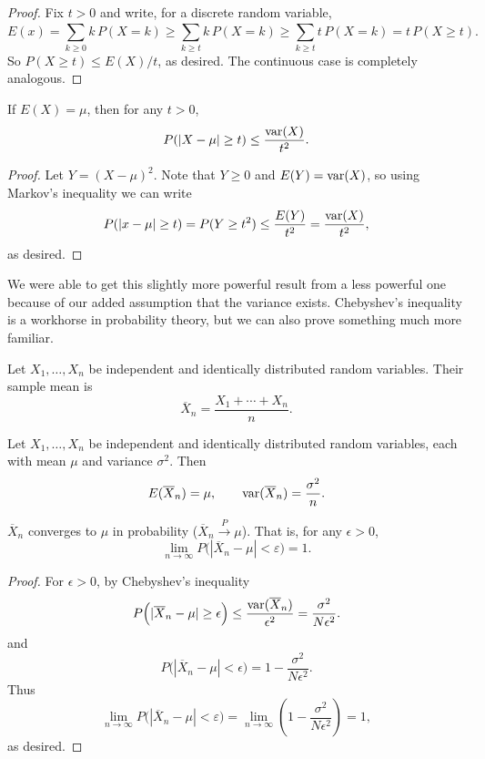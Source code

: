 \documentclass[../m157main.tex]{subfiles}
\begin{document}
\begin{proof}
    Fix $t > 0$ and write, for a discrete random variable,
    \[ E(x) = \sum_{k \geq 0}^{} k \,P(X = k) \geq \sum_{k \geq t}^{} k \, P(X = k) \geq \sum_{k \geq t}^{} t \, P(X = k) = t \,P(X \geq t). \]
    So $P(X \geq t) \leq E(X) / t$, as desired.
    The continuous case is completely analogous.
\end{proof}

\begin{theorem}
    If $E(X) = \mu$, then for any $t > 0$,
    \[ P(|X - \mu| \geq t) \leq \frac{\operatorname{var}(X)}{t^2}. \]
\end{theorem}

\begin{proof}
    Let $Y = (X-\mu)^2$.
    Note that $Y \geq 0$ and $E(Y) = \operatorname{var}(X)$, so using Markov's inequality we can write
    \[ P(|x - \mu| \geq t) = P(Y \geq t^2) \leq \frac{E(Y)}{t^2} = \frac{\operatorname{var}(X)}{t^2}, \]
    as desired.
\end{proof}

We were able to get this slightly more powerful result from a less powerful one because of our added assumption that the variance exists.
Chebyshev's inequality is a workhorse in probability theory, but we can also prove something much more familiar.

\begin{definition}
    Let $X_1, \ldots, X_n$ be independent and identically distributed random variables.
    Their sample mean is
    \[ \overline{X}_n = \frac{X_1 + \cdots + X_n}{n}. \]
\end{definition}

\begin{theorem}
    Let $X_1, \ldots, X_n$ be independent and identically distributed random variables, each with mean $\mu$ and variance $\sigma^2$.
    Then
    \[ E(\overline{X}_n) = \mu, \qquad \operatorname{var}(\overline{X}_n) = \frac{\sigma^2}{n}. \]
\end{theorem}

\begin{theorem}
    $\overline{X}_n$ converges to $\mu$ in probability ($\overline{X}_n \overset{P}{\to} \mu$).
    That is, for any $\epsilon > 0$,
    \[ \lim_{n \to \infty} P \Big( |\overline{X}_n - \mu| < \varepsilon \Big) = 1. \]
\end{theorem}

\begin{proof}
    For $\epsilon > 0$, by Chebyshev's inequality
    \[ P \Big( |\overline{X}_n - \mu| \geq \epsilon \Big) \leq \frac{\operatorname{var}(\overline{X}_n)}{\epsilon^2} = \frac{\sigma^2}{N \epsilon^2}. \]
    and
    \[ P \Big( |\overline{X}_n - \mu| < \epsilon \Big) = 1 - \frac{\sigma^2}{N\epsilon^2}. \]
    Thus
    \[ \lim_{n \to \infty} P \Big( |\overline{X}_n - \mu| < \varepsilon \Big) = \lim_{n \to \infty} \left( 1 - \frac{\sigma^2}{N \epsilon^2} \right) = 1, \]
    as desired.
\end{proof}
\end{document}

